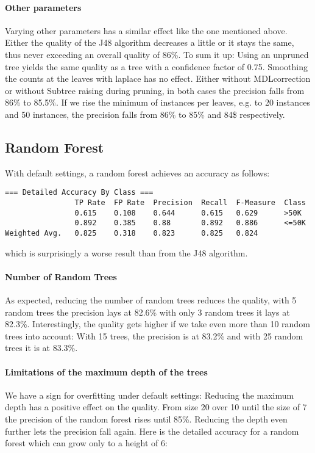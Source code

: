 \documentclass[paper=a4, fontsize=11pt]{scrartcl} %
\numberwithin{equation}{section} %
\numberwithin{figure}{section} %
\numberwithin{table}{section} %
\begin{document}
\paragraph{Other parameters}
Varying other parameters has a similar effect like the one mentioned above. Either the quality of the J48 algorithm decreases a little or it stays the same, thus never exceeding an overall quality of 86\%. To sum it up: Using an unpruned tree yields the same quality as a tree with a confidence factor of 0.75. Smoothing the counts at the leaves with laplace has no effect. Either without MDLcorrection or without Subtree raising during pruning, in both cases the precision falls from 86\% to 85.5\%. If we rise the minimum of instances per leaves, e.g. to 20 instances and 50 instances, the precision falls from 86\% to 85\% and 84\$ respectively.

\subsection{Random Forest}

With default settings, a random forest achieves an accuracy as follows:
\begin{lstlisting}
=== Detailed Accuracy By Class ===
                TP Rate  FP Rate  Precision  Recall  F-Measure  Class
                0.615    0.108    0.644      0.615   0.629      >50K
                0.892    0.385    0.88       0.892   0.886      <=50K
Weighted Avg.   0.825    0.318    0.823      0.825   0.824     
\end{lstlisting}
which is surprisingly a worse result than from the J48 algorithm. 

\paragraph{Number of Random Trees}
As expected, reducing the number of random trees reduces the quality, with 5 random trees the precision lays at 82.6\% with only 3 random trees it lays at 82.3\%. Interestingly, the quality gets higher if we take even more than 10 random trees into account: With 15 trees, the precision is at 83.2\% and with 25 random trees it is at 83.3\%.

\paragraph{Limitations of the maximum depth of the trees}
We have a sign for overfitting under default settings: Reducing the maximum depth has a positive effect on the quality. From size 20 over 10 until the size of 7 the precision of the random forest rises until 85\%. Reducing the depth even further lets the precision fall again. Here is the detailed accuracy for a random forest which can grow only to a height of 6:
\end{document}
